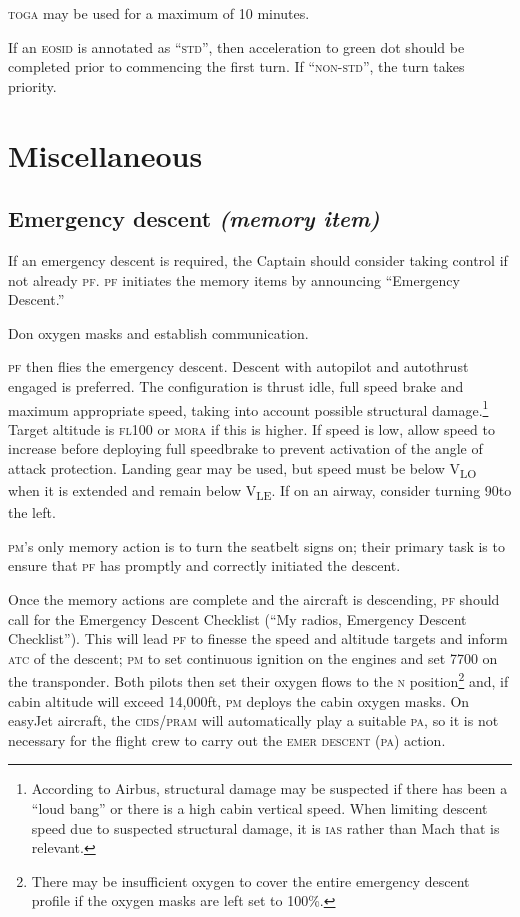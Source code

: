 \documentclass[a5paper,11pt,twoside]{book}
\newcommand{\ac}[1]{{\scshape\MakeLowercase{#1}}}
\newcommand{\ecam}[2]{{\ac{\uline{#1} #2}}}
\newcommand{\cphrase}[1]{\ac{#1}}
\newcommand{\inlcite}[1]{{\ac{#1}}}
\newcommand{\multicite}[1]{%
  \nopagebreak
  \noindent{{\color{blue}\footnotesize[ \inlcite{#1} ]}}
}
\newcommand{\V}[1]{V\textsubscript{#1}}
\begin{document}
\ac{TOGA} may be used for a maximum of 10 minutes.

If an \ac{EOSID} is annotated as ``\cphrase{STD}'', then acceleration to green
dot should be completed prior to commencing the first turn. If
``\cphrase{NON-STD}'', the turn takes priority.

\multicite{EOMB~4.4.4, FCOM~DSC.22\_20.60.40}

\chapter{Miscellaneous}

\section{Emergency descent \emph{(memory item)}}
\label{sec-emer-descent}

If an emergency descent is required, the Captain should consider taking control
if not already \ac{PF}. \ac{PF} initiates the memory items by announcing
``Emergency Descent.''

Don oxygen masks and establish communication.

\ac{PF} then flies the emergency descent.  Descent with autopilot and autothrust
engaged is preferred. The configuration is thrust idle, full speed brake and
maximum appropriate speed, taking into account possible structural
damage.\footnote{According to Airbus, structural damage may be suspected if
there has been a ``loud bang'' or there is a high cabin vertical speed. When
limiting descent speed due to suspected structural damage, it is \ac{IAS} rather
than Mach that is relevant.} Target altitude is \ac{FL100} or \ac{MORA} if this
is higher. If speed is low, allow speed to increase before deploying full
speedbrake to prevent activation of the angle of attack protection. Landing gear
may be used, but speed must be below \V{LO} when it is extended and remain below
\V{LE}. If on an airway, consider turning 90\textdegree{ }to the left.

\ac{PM}'s only memory action is to turn the seatbelt signs on; their primary
task is to ensure that \ac{PF} has promptly and correctly initiated the descent.

Once the memory actions are complete and the aircraft is descending, \ac{PF}
should call for the Emergency Descent Checklist (``My radios, Emergency Descent
Checklist''). This will lead \ac{PF} to finesse the speed and altitude targets and
inform \ac{ATC} of the descent; \ac{PM} to set continuous ignition on the engines and set
7700 on the transponder. Both pilots then set their oxygen flows to the \ac{N}
position\footnote{There may be insufficient oxygen to cover the entire emergency
descent profile if the oxygen masks are left set to 100\%.} and, if cabin
altitude will exceed 14,000ft, \ac{PM} deploys the cabin oxygen masks. On easyJet
aircraft, the \ac{CIDS}/\ac{PRAM} will automatically play a suitable \ac{PA}, so it is not
necessary for the flight crew to carry out the \ecam{}{EMER DESCENT (PA)} action.
\end{document}
